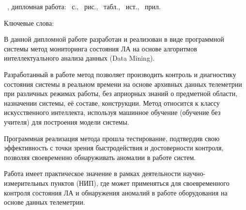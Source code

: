 \protect{}
\sloppy
{
\theauthor\ \MakeUppercase{\thethesistitle}, дипломная работа: \pagecount~с., ~рис., ~табл., ~ист., ~прил.

Ключевые слова: \MakeUppercase{\thekeywords}
}
\medskip

В данной дипломной работе разработан и реализован в виде программной системы метод мониторинга состояния ЛА на основе алгоритмов интеллектуального анализа данных (Data Mining).

Разработанный в работе метод позволяет производить контроль и диагностику состояния системы в реальном времени на основе архивных данных телеметрии при различных режимах работы, без априорных знаний о предметной области, назначении системы, её составе, конструкции. Метод относится к классу искусственного интеллекта, используя машинное обучение (обучение без учителя) для построения модели системы.

Программная реализация метода прошла тестирование, подтвердив свою эффективность с точки зрения быстродействия и достоверности контроля, позволяя своевременно обнаруживать аномалии в работе систем.

Работа имеет практическое значение в рамках деятельности научно-измерительных пунктов (НИП), где может применяться для своевременного контроля состояния ЛА и обнаружения аномалий в работе оборудования на основе данных телеметрии.